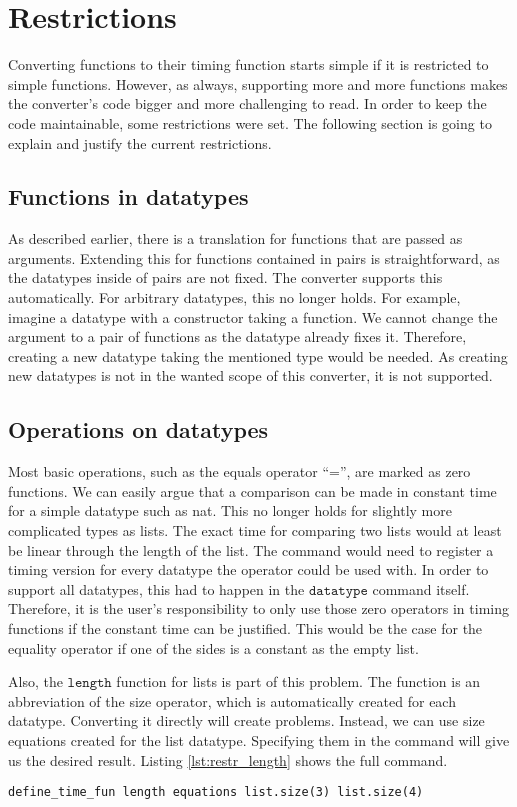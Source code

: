 
\section{Restrictions} \label{chapter:restrictions}

Converting functions to their timing function starts simple if it is restricted to simple functions.
However, as always, supporting more and more functions makes the converter's code bigger and more challenging to read.
In order to keep the code maintainable, some restrictions were set.
The following section is going to explain and justify the current restrictions.

\subsection{Functions in datatypes}
As described earlier, there is a translation for functions that are passed as arguments.
Extending this for functions contained in pairs is straightforward, as the datatypes inside of pairs are not fixed.
The converter supports this automatically.
For arbitrary datatypes, this no longer holds.
For example, imagine a datatype with a constructor taking a function.
We cannot change the argument to a pair of functions as the datatype already fixes it.
Therefore, creating a new datatype taking the mentioned type would be needed.
As creating new datatypes is not in the wanted scope of this converter, it is not supported.

\subsection{Operations on datatypes} \label{chapter:nonconstant_zeros}
Most basic operations, such as the equals operator ``='', are marked as zero functions.
We can easily argue that a comparison can be made in constant time for a simple datatype such as nat.
This no longer holds for slightly more complicated types as lists.
The exact time for comparing two lists would at least be linear through the length of the list.
The command would need to register a timing version for every datatype the operator could be used with.
In order to support all datatypes, this had to happen in the $\texttt{datatype}$ command itself.
Therefore, it is the user's responsibility to only use those zero operators in timing functions if the constant time can be justified.
This would be the case for the equality operator if one of the sides is a constant as the empty list.

Also, the $\texttt{length}$ function for lists is part of this problem.
The function is an abbreviation of the size operator, which is automatically created for each datatype.
Converting it directly will create problems.
Instead, we can use size equations created for the list datatype.
Specifying them in the command will give us the desired result.
Listing \ref{lst:restr_length} shows the full command.
\begin{lstlisting}[language=isabelle,float,label=lst:restr_length,caption=Converting the length function correctly]
  define_time_fun length equations list.size(3) list.size(4)
\end{lstlisting}

